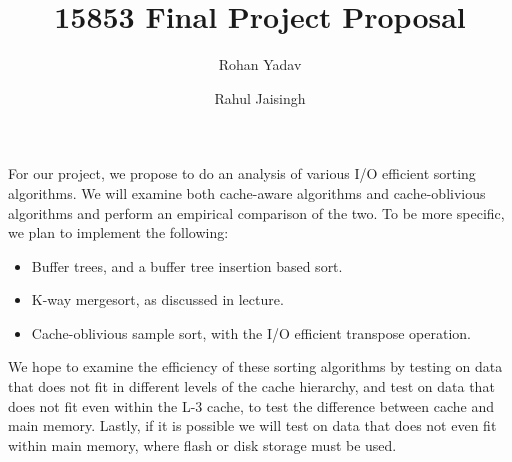\documentclass{article}
\author{
  Rohan Yadav\\
  \and
  Rahul Jaisingh\\
}
\title{15853 Final Project Proposal}
\date{}
\begin{document}
\maketitle

For our project, we propose to do an analysis of various I/O efficient
sorting algorithms.
%
We will examine both cache-aware algorithms and cache-oblivious algorithms
and perform an empirical comparison of the two.
%
To be more specific, we plan to implement the following:
\begin{itemize}
\item Buffer trees, and a buffer tree insertion based sort.
\item K-way mergesort, as discussed in lecture.
\item Cache-oblivious sample sort, with the I/O efficient transpose operation.
\end{itemize}
We hope to examine the efficiency of these sorting algorithms by testing on data
that does not fit in different levels of the cache hierarchy, and test on data
that does not fit even within the L-3 cache, to test the difference between
cache and main memory.
%
Lastly, if it is possible we will test on data that does not even fit within main memory,
where flash or disk storage must be used.
\end{document}
